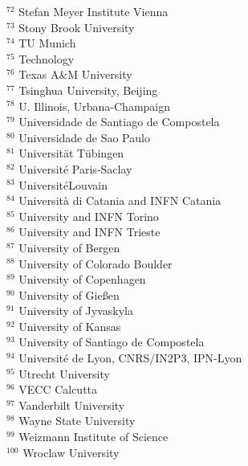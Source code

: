 {$^{72}$ Stefan Meyer Institute Vienna\\
$^{73}$ Stony Brook University\\
$^{74}$ TU Munich\\
$^{75}$ Technology\\
$^{76}$ Texas A\&M University\\
$^{77}$ Tsinghua University, Beijing\\
$^{78}$ U. Illinois, Urbana-Champaign\\
$^{79}$ Universidade de Santiago de Compostela\\
$^{80}$ Universidade de Sao Paulo\\
$^{81}$ Universit\"{a}t T\"{u}bingen\\
$^{82}$ Universit\'e Paris-Saclay\\
$^{83}$ Universit\'{e}Louvain\\
$^{84}$ Universit\`a di Catania and INFN Catania\\
$^{85}$ University and INFN Torino\\
$^{86}$ University and INFN Trieste\\
$^{87}$ University of Bergen\\
$^{88}$ University of Colorado Boulder\\
$^{89}$ University of Copenhagen\\
$^{90}$ University of Gie{\ss}en\\
$^{91}$ University of Jyvaskyla\\
$^{92}$ University of Kansas\\
$^{93}$ University of Santiago de Compostela\\
$^{94}$ Universit{\'e} de Lyon, CNRS/IN2P3, IPN-Lyon\\
$^{95}$ Utrecht University\\
$^{96}$ VECC Calcutta\\
$^{97}$ Vanderbilt University\\
$^{98}$ Wayne State University\\
$^{99}$ Weizmann Institute of Science\\
$^{100}$ Wroclaw University\\
}
